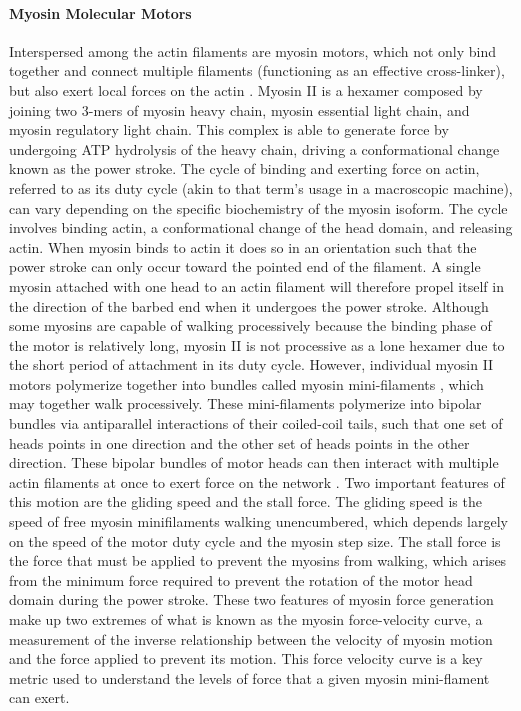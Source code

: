 \paragraph{Myosin Molecular Motors} Interspersed among the actin filaments are myosin motors, which not only bind together and connect multiple filaments (functioning as an effective cross-linker), but also exert local forces on the actin \cite{Dasanayake2013}.  Myosin II is a hexamer composed by joining two 3-mers of myosin heavy chain, myosin essential light chain, and myosin regulatory light chain. This complex is able to generate force by undergoing ATP hydrolysis of the heavy chain, driving a conformational change known as the power stroke. The cycle of binding and exerting force on actin, referred to as its duty cycle (akin to that term’s usage in a macroscopic machine), can vary depending on the specific biochemistry of the myosin isoform.  The cycle involves binding actin, a conformational change of the head domain, and releasing actin.  When myosin binds to actin it does so in an orientation such that the power stroke can only occur toward the pointed end of the filament. A single myosin attached with one head to an actin filament will therefore propel itself in the direction of the barbed end when it undergoes the power stroke. Although some myosins are capable of walking processively because the binding phase of the motor is relatively long, myosin II is not processive as a lone hexamer due to the short period of attachment in its duty cycle.  However, individual myosin II motors polymerize together into bundles called myosin mini-filaments \cite{Dasanayake2013}, which may together walk processively. These mini-filaments polymerize into bipolar bundles via antiparallel interactions of their coiled-coil tails, such that one set of heads points in one direction and the other set of heads points in the other direction. These bipolar bundles of motor heads can then interact with multiple actin filaments at once to exert force on the network \cite{Bing2000}. Two important features of this motion are the gliding speed and the stall force. The gliding speed is the speed of free myosin minifilaments walking unencumbered, which depends largely on the speed of the motor duty cycle and the myosin step size.  The stall force is the force that must be applied to prevent the myosins from walking, which arises from the minimum force required to prevent the rotation of the motor head domain during the power stroke.  These two features of myosin force generation make up two extremes of what is known as the myosin force-velocity curve, a measurement of the inverse relationship between the velocity of myosin motion and the force applied to prevent its motion.  This force velocity curve is a key metric used to understand the levels of force that a given myosin mini-flament can exert.



